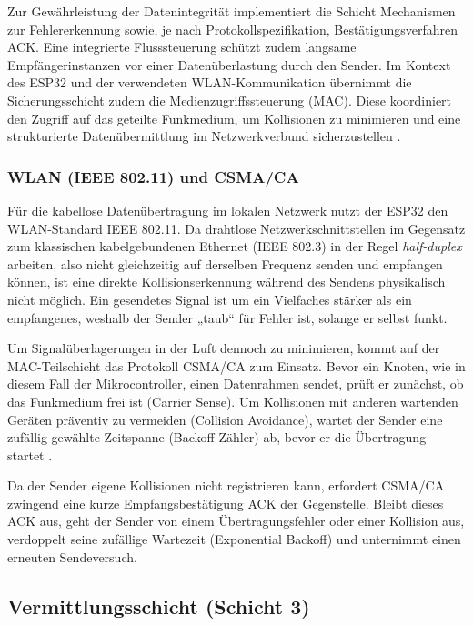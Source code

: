 Zur Gewährleistung der Datenintegrität implementiert die Schicht Mechanismen zur Fehlererkennung sowie, je nach Protokollspezifikation, Bestätigungsverfahren \ac{ACK}. Eine integrierte Flusssteuerung schützt zudem langsame Empfängerinstanzen vor einer Datenüberlastung durch den Sender. Im Kontext des ESP32 und der verwendeten WLAN-Kommunikation übernimmt die Sicherungsschicht zudem die Medienzugriffssteuerung (MAC). Diese koordiniert den Zugriff auf das geteilte Funkmedium, um Kollisionen zu minimieren und eine strukturierte Datenübermittlung im Netzwerkverbund sicherzustellen .

\subsubsection{WLAN (IEEE 802.11) und CSMA/CA}

Für die kabellose Datenübertragung im lokalen Netzwerk nutzt der ESP32 den WLAN-Standard IEEE 802.11. Da drahtlose Netzwerkschnittstellen im Gegensatz zum klassischen kabelgebundenen Ethernet (IEEE 802.3)  in der Regel \textit{half-duplex} arbeiten, also nicht gleichzeitig auf derselben Frequenz senden und empfangen können, ist eine direkte Kollisionserkennung während des Sendens physikalisch nicht möglich. Ein gesendetes Signal ist um ein Vielfaches stärker als ein empfangenes, weshalb der Sender „taub“ für Fehler ist, solange er selbst funkt.

Um Signalüberlagerungen in der Luft dennoch zu minimieren, kommt auf der MAC-Teilschicht das Protokoll \ac{CSMA/CA} zum Einsatz. Bevor ein Knoten, wie in diesem Fall der Mikrocontroller, einen Datenrahmen sendet, prüft er zunächst, ob das Funkmedium frei ist (Carrier Sense). Um Kollisionen mit anderen wartenden Geräten präventiv zu vermeiden (Collision Avoidance), wartet der Sender eine zufällig gewählte Zeitspanne (Backoff-Zähler) ab, bevor er die Übertragung startet .

Da der Sender eigene Kollisionen nicht registrieren kann, erfordert \ac{CSMA/CA} zwingend eine kurze Empfangsbestätigung \ac{ACK} der Gegenstelle. Bleibt dieses \ac{ACK} aus, geht der Sender von einem Übertragungsfehler oder einer Kollision aus, verdoppelt seine zufällige Wartezeit (Exponential Backoff) und unternimmt einen erneuten Sendeversuch.

\subsection{Vermittlungsschicht (Schicht 3)}

